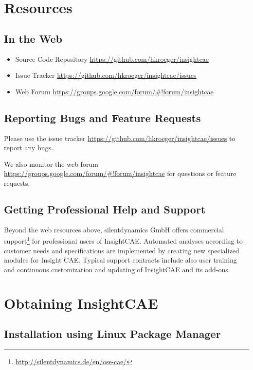 \section{Resources}

\subsection{In the Web}

\begin{itemize}
\item Source Code Repository \url{https://github.com/hkroeger/insightcae}
\item Issue Tracker \url{https://github.com/hkroeger/insightcae/issues}
\item Web Forum \url{https://groups.google.com/forum/#!forum/insightcae}
\end{itemize}

\subsection{Reporting Bugs and Feature Requests}

Please use the issue tracker \url{https://github.com/hkroeger/insightcae/issues} to report any bugs.

We also monitor the web forum \url{https://groups.google.com/forum/#!forum/insightcae} for questions or feature requests.

\subsection{Getting Professional Help and Support}

Beyond the web resources above, silentdynamics GmbH offers commercial support\footnote{\url{http://silentdynamics.de/en/oss-cae/}} for professional users of InsightCAE. Automated analyses according to customer needs and specifications are implemented  by creating new specialized modules for Insight CAE.
Typical support contracts include also user training and continuous customization and updating of InsightCAE and its add-ons.






\section{Obtaining InsightCAE}

\subsection{Installation using Linux Package Manager}

